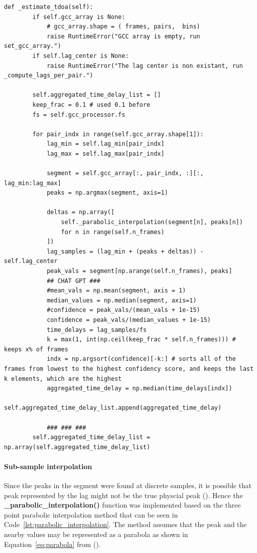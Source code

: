     \begin{lstlisting}[style=pythonstyle, caption={Function used to estimate the TDOA between the microphones.}, label={lst:estimated_tdoa}]
     def _estimate_tdoa(self): 
        if self.gcc_array is None:
            # gcc_array.shape = ( frames, pairs,  bins)
            raise RuntimeError("GCC array is empty, run set_gcc_array.")
        if self.lag_center is None:
            raise RuntimeError("The lag center is non existant, run _compute_lags_per_pair.")
    
        self.aggregated_time_delay_list = []
        keep_frac = 0.1 # used 0.1 before
        fs = self.gcc_processor.fs

        for pair_indx in range(self.gcc_array.shape[1]):
            lag_min = self.lag_min[pair_indx]
            lag_max = self.lag_max[pair_indx]

            segment = self.gcc_array[:, pair_indx, :][:, lag_min:lag_max]
            peaks = np.argmax(segment, axis=1)
            
            deltas = np.array([
                self._parabolic_interpolation(segment[n], peaks[n])
                for n in range(self.n_frames)
            ])
            lag_samples = (lag_min + (peaks + deltas)) - self.lag_center
            peak_vals = segment[np.arange(self.n_frames), peaks]
            ## CHAT GPT ###
            #mean_vals = np.mean(segment, axis = 1)
            median_values = np.median(segment, axis=1)
            #confidence = peak_vals/(mean_vals + 1e-15)
            confidence = peak_vals/(median_values + 1e-15)
            time_delays = lag_samples/fs 
            k = max(1, int(np.ceil(keep_frac * self.n_frames))) # keeps x% of frames
            indx = np.argsort(confidence)[-k:] # sorts all of the frames from lowest to the highest confidency score, and keeps the last k elements, which are the highest 
            aggregated_time_delay = np.median(time_delays[indx])
            self.aggregated_time_delay_list.append(aggregated_time_delay)
            
            ### ### ### 
        self.aggregated_time_delay_list = np.array(self.aggregated_time_delay_list)

    \end{lstlisting}
    \newpage
    \paragraph{Sub-sample interpolation}
    Since the peaks in the segment were found at discrete samples, it is possible that peak represented by the lag might not be the true physcial peak (\cite{lai1999interpolation}). Hence the \textbf{\_parabolic\_interpolation()} function was implemented based on the three point parabolic interpolation method that can be seen in Code~\ref{lst:parabolic_interpolation}. The method assumes that the peak and the nearby values may be represented as a parabola as shown in Equation~\ref{eq:parabola} from (\cite{lai1999interpolation}).

